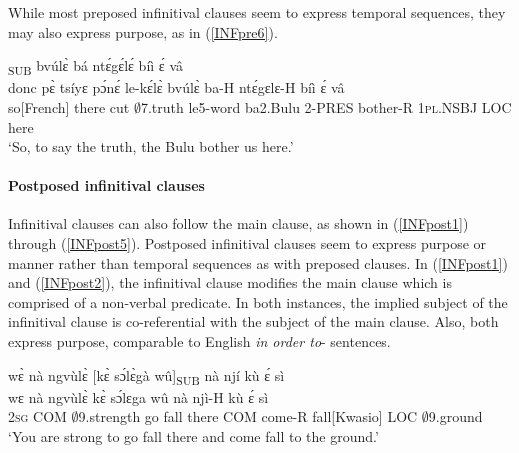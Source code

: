 \noindent While most preposed infinitival clauses seem to express temporal sequences, they may also express purpose, as in (\ref{INFpre6}).

\begin{exe} 
\ex\label{INFpre6}
  \textsubscript{SUB} bvúlɛ̀ bá ntɛ́gɛ́lɛ́ bíì ɛ́ vâ \\
         donc pɛ̀ tsíyɛ pɔ́nɛ́ le-kɛ́lɛ̀ bvúlɛ̀ ba-H ntɛ́gɛlɛ-H bíì ɛ́ vâ \\
         so[French] there cut $\emptyset$7.truth le5-word ba2.Bulu 2-PRES bother-R 1\textsc{pl}.NSBJ LOC here   \\
    \trans `So, to say the truth, the Bulu bother us here.'
\end{exe}



\paragraph{Postposed infinitival clauses}

Infinitival clauses can also follow the main clause, as shown in (\ref{INFpost1}) through (\ref{INFpost5}). Postposed infinitival clauses seem to express purpose or manner rather than temporal sequences as with preposed clauses. In (\ref{INFpost1}) and (\ref{INFpost2}), the infinitival clause modifies the main clause which is comprised of a non-verbal predicate. In both instances, the implied subject of the infinitival clause is co-referential with the subject of the main clause. Also, both express purpose, comparable to English {\itshape in order to}- sentences.


\begin{exe} 
\ex\label{INFpost1}
  \glll     wɛ̀ nà ngvùlɛ̀ [kɛ̀ sɔ́lɛ̀gà wû]\textsubscript{SUB} nà njí kù ɛ́ sì\\
            wɛ nà ngvùlɛ̀ kɛ̀ sɔ́lɛga wû nà njì-H kù ɛ́ sì\\
           2\textsc{sg} COM $\emptyset$9.strength go fall there COM come-R fall[Kwasio] LOC $\emptyset$9.ground\\
    \trans `You are strong to go fall there and come fall to the ground.'
\end{exe}

